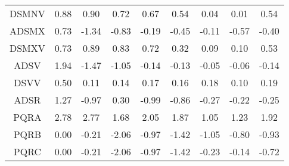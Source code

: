 \begin{longtable}{ | c || c | c | c | c | c | c | c || c |}
DSMNV &  \cellcolor[HTML]{E7E7FF} 0.88 &  \cellcolor[HTML]{E7E7FF} 0.90 &  \cellcolor[HTML]{EFEFFF} 0.72 &  \cellcolor[HTML]{EFEFFF} 0.67 &  \cellcolor[HTML]{EFEFFF} 0.54 &  \cellcolor[HTML]{FFFFFF} 0.04 &  \cellcolor[HTML]{FFFFFF} 0.01 &  \cellcolor[HTML]{EFEFFF} 0.54 \\
ADSMX &  \cellcolor[HTML]{EFEFFF} 0.73 &  \cellcolor[HTML]{FFDFDF} -1.34 &  \cellcolor[HTML]{FFE7E7} -0.83 &  \cellcolor[HTML]{FFF7F7} -0.19 &  \cellcolor[HTML]{FFF7F7} -0.45 &  \cellcolor[HTML]{FFFFFF} -0.11 &  \cellcolor[HTML]{FFEFEF} -0.57 &  \cellcolor[HTML]{FFF7F7} -0.40 \\
DSMXV &  \cellcolor[HTML]{EFEFFF} 0.73 &  \cellcolor[HTML]{E7E7FF} 0.89 &  \cellcolor[HTML]{E7E7FF} 0.83 &  \cellcolor[HTML]{EFEFFF} 0.72 &  \cellcolor[HTML]{F7F7FF} 0.32 &  \cellcolor[HTML]{FFFFFF} 0.09 &  \cellcolor[HTML]{FFFFFF} 0.10 &  \cellcolor[HTML]{EFEFFF} 0.53 \\
ADSV &  \cellcolor[HTML]{CFCFFF} 1.94 &  \cellcolor[HTML]{FFD7D7} -1.47 &  \cellcolor[HTML]{FFE7E7} -1.05 &  \cellcolor[HTML]{FFFFFF} -0.14 &  \cellcolor[HTML]{FFFFFF} -0.13 &  \cellcolor[HTML]{FFFFFF} -0.05 &  \cellcolor[HTML]{FFFFFF} -0.06 &  \cellcolor[HTML]{FFFFFF} -0.14 \\
DSVV &  \cellcolor[HTML]{EFEFFF} 0.50 &  \cellcolor[HTML]{FFFFFF} 0.11 &  \cellcolor[HTML]{FFFFFF} 0.14 &  \cellcolor[HTML]{F7F7FF} 0.17 &  \cellcolor[HTML]{F7F7FF} 0.16 &  \cellcolor[HTML]{F7F7FF} 0.18 &  \cellcolor[HTML]{FFFFFF} 0.10 &  \cellcolor[HTML]{F7F7FF} 0.19 \\
ADSR &  \cellcolor[HTML]{DFDFFF} 1.27 &  \cellcolor[HTML]{FFE7E7} -0.97 &  \cellcolor[HTML]{F7F7FF} 0.30 &  \cellcolor[HTML]{FFE7E7} -0.99 &  \cellcolor[HTML]{FFE7E7} -0.86 &  \cellcolor[HTML]{FFF7F7} -0.27 &  \cellcolor[HTML]{FFF7F7} -0.22 &  \cellcolor[HTML]{FFF7F7} -0.25 \\
PQRA &  \cellcolor[HTML]{B7B7FF} 2.78 &  \cellcolor[HTML]{B7B7FF} 2.77 &  \cellcolor[HTML]{D7D7FF} 1.68 &  \cellcolor[HTML]{CFCFFF} 2.05 &  \cellcolor[HTML]{CFCFFF} 1.87 &  \cellcolor[HTML]{E7E7FF} 1.05 &  \cellcolor[HTML]{DFDFFF} 1.23 &  \cellcolor[HTML]{CFCFFF} 1.92 \\
PQRB &  \cellcolor[HTML]{FFFFFF} 0.00 &  \cellcolor[HTML]{FFF7F7} -0.21 &  \cellcolor[HTML]{FFCFCF} -2.06 &  \cellcolor[HTML]{FFE7E7} -0.97 &  \cellcolor[HTML]{FFDFDF} -1.42 &  \cellcolor[HTML]{FFE7E7} -1.05 &  \cellcolor[HTML]{FFE7E7} -0.80 &  \cellcolor[HTML]{FFE7E7} -0.93 \\
PQRC &  \cellcolor[HTML]{FFFFFF} 0.00 &  \cellcolor[HTML]{FFF7F7} -0.21 &  \cellcolor[HTML]{FFCFCF} -2.06 &  \cellcolor[HTML]{FFE7E7} -0.97 &  \cellcolor[HTML]{FFDFDF} -1.42 &  \cellcolor[HTML]{FFF7F7} -0.23 &  \cellcolor[HTML]{FFFFFF} -0.14 &  \cellcolor[HTML]{FFEFEF} -0.72 \\

\end{longtable}
